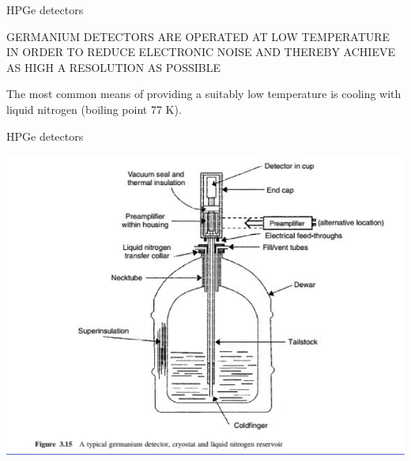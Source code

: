 \begin{frame}{HPGe detectors}

\begin{block}{}
GERMANIUM DETECTORS ARE OPERATED AT LOW TEMPERATURE IN ORDER TO REDUCE ELECTRONIC NOISE AND THEREBY ACHIEVE AS HIGH A RESOLUTION AS POSSIBLE
\end{block}

\centering \arrowdown

\begin{block}
The most common means of providing a suitably low temperature is cooling with liquid nitrogen (boiling point 77 K).
\end{block}

\end{frame}

\begin{frame}{HPGe detectors}

\centering
\includegraphics[scale=0.4]{figures/schemehpge.png}

\end{frame}

